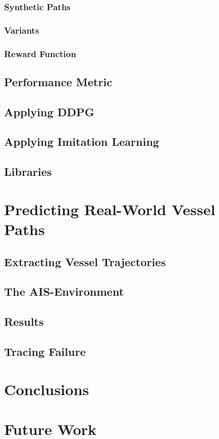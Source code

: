         \subsubsection{Synthetic Paths}
        
        \subsubsection{Variants}
        
        \subsubsection{Reward Function}\label{subchap:reward}
        
        
    \subsection{Performance Metric}
    
    \subsection{Applying DDPG}
    
    \newpage
    \subsection{Applying Imitation Learning} \label{subchap:applyBC}
    
    \subsection{Libraries}
    
    
\newpage
\section{Predicting Real-World Vessel Paths}\label{chap:realworld}

    \subsection{Extracting Vessel Trajectories}
    
    \subsection{The AIS-Environment}
    
    \subsection{Results}
    \subsection{Tracing Failure}
    
 
\newpage   
\section{Conclusions}
\newpage
\section{Future Work}




